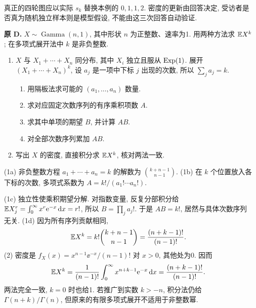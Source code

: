 \begin{solution}
\begin{center}
\hfill
{}
\end{center}
真正的四轮图应以实际 $s_k$ 替换本例的 $0,1,1,2$. 密度的更新由回答决定, 受访者是否真为随机独立样本则是模型假设, 不能由这三次回答自动验证.
\end{solution}

\begin{exercise}\label{ex:P7.D}
\textbf{原 D.} $X\sim\operatorname{Gamma}(n,1)$, 其中形状 $n$ 为正整数、速率为1. 用两种方法求 $\mathbb E X^k$; 在多项式展开法中 $k$ 是非负整数.
\begin{enumerate}[label=\arabic*.]
\item $X$ 与 $X_1+\cdots+X_n$ 同分布, 其中 $X_i$ 独立且服从 $\operatorname{Exp}(1)$. 展开 $(X_1+\cdots+X_n)^k$, 设 $a_j$ 是一项中下标 $j$ 出现的次数, 所以 $\sum_j a_j=k$.
\begin{enumerate}[label=(\alph*)]
\item\label{part:P7.D.1.a} 用隔板法求可能的 $(a_1,\ldots,a_n)$ 数量.
\item\label{part:P7.D.1.b} 求对应固定次数序列的有序乘积项数 $A$.
\item\label{part:P7.D.1.c} 求其中单项的期望 $B$, 并计算 $AB$.
\item\label{part:P7.D.1.d} 对全部次数序列累加 $AB$.
\end{enumerate}
\item\label{part:P7.D.2} 写出 $X$ 的密度, 直接积分求 $\mathbb E X^k$, 核对两法一致.
\end{enumerate}
\end{exercise}
\begin{solution}\label{sol:P7.D}
(1a) 非负整数方程 $a_1+\cdots+a_n=k$ 的解数为 $\binom{k+n-1}{n-1}$. (1b) 在 $k$ 个位置放入各下标的次数, 多项式系数为 $A=k!/(a_1!\cdots a_n!)$.

(1c) 独立性使乘积期望分解. 对指数变量, 反复分部积分给 $\mathbb E X_j^r=\int_0^\infty x^r\mathrm e^{-x}\,\mathrm d x=r!$, 所以 $B=\prod_j a_j!$. 于是 $AB=k!$, 居然与具体次数序列无关. (1d) 因为所有序列贡献相同,
\[
 \mathbb E X^k=k!\binom{k+n-1}{n-1}=\frac{(n+k-1)!}{(n-1)!}.
\]
(2) 密度是 $f_X(x)=x^{n-1}\ee^{-x}/(n-1)!$ 对 $x>0$, 其他处为0. 因而
\[
 \mathbb E X^k=\frac1{(n-1)!}\int_0^\infty x^{n+k-1}\mathrm e^{-x}\,\mathrm d x
 =\frac{(n+k-1)!}{(n-1)!}.
\]
两法完全一致, $k=0$ 时也给1. 若推广到实数 $k>-n$, 积分法仍给 $\Gamma(n+k)/\Gamma(n)$, 但原来的有限多项式展开不适用于非整数幂.
\end{solution}

